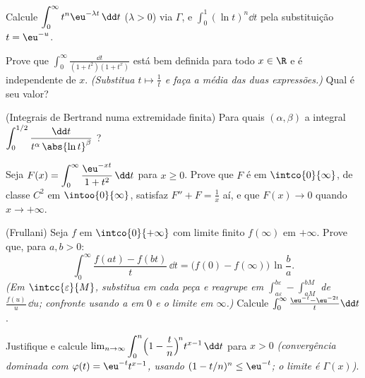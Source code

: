 \begin{exercise}[$\star$]\label{exo:b2:integration:2}
Calcule $\displaystyle\int_0^\infty t^n \eu^{-\lambda t}\,\dd t$
($\lambda > 0$) via $\Gamma$, e
$\displaystyle\int_0^1 (\ln t)^n \dd t$ pela substituição $t =
\eu^{-u}$.
\end{exercise}

\begin{exercise}[$\star$]\label{exo:b2:integration:3}
Prove que $\displaystyle\int_0^{\infty} \frac{\dd t}{(1 +
t^2)(1 + t^x)}$ está bem definida para todo $x \in \R$ e é
independente de $x$. \emph{(Substitua $t \mapsto \frac1t$ e
faça a média das duas expressões.)} Qual é seu valor?
\end{exercise}

\begin{exercise}[$\star\star$]\label{exo:b2:integration:4}
(Integrais de Bertrand numa extremidade finita) Para quais $(\alpha,
\beta)$ a integral $\displaystyle\int_0^{1/2}
\frac{\dd t}{t^\alpha\,\abs{\ln t}^\beta}$ ?
\end{exercise}

\begin{exercise}[$\star\star$]\label{exo:b2:integration:5}
Seja $F(x) = \displaystyle\int_0^{\infty} \frac{\eu^{-xt}}{1 +
t^2}\,\dd t$ para $x \geq 0$. Prove que $F$ é  em
$\intco{0}{\infty}$, de classe $C^2$ em $\intoo{0}{\infty}$, satisfaz $F'' +
F = \frac1x$ aí, e que $F(x) \to 0$ quando $x \to +\infty$.
\end{exercise}

\begin{exercise}[$\star\star$]\label{exo:b2:integration:6}
(Frullani) Seja $f$  em $\intco{0}{+\infty}$ com
limite finito $f(\infty)$ em $+\infty$. Prove que, para $a, b > 0$:
\[
\int_0^{\infty} \frac{f(at) - f(bt)}{t}\,\dd t
= \bigl(f(0) - f(\infty)\bigr)\,\ln\frac ba .
\]
\emph{(Em $\intcc{\varepsilon}{M}$, substitua em cada peça e
reagrupe em $\int_{a\varepsilon}^{b\varepsilon} -
\int_{aM}^{bM}$ de $\frac{f(u)}u\,\dd u$; confronte usando a
 em $0$ e o limite em $\infty$.)} Calcule
$\int_0^\infty \frac{\eu^{-t} - \eu^{-2t}}{t}\dd t$.
\end{exercise}

\begin{exercise}[$\star\star$]\label{exo:b2:integration:7}
Justifique e calcule $\lim_{n\to\infty} \displaystyle\int_0^n
\Bigl(1 - \frac tn\Bigr)^{\!n} t^{x-1}\,\dd t$ para $x > 0$
\emph{(convergência dominada com $\varphi(t) = \eu^{-t}t^{x-1}$,
usando $(1 - t/n)^n \leq \eu^{-t}$; o limite é $\Gamma(x)$)}.
\end{exercise}

